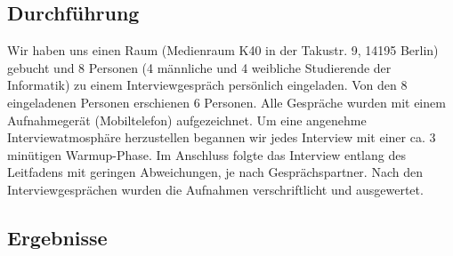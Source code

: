 \documentclass{article}
\begin{document}
\subsection{Durchführung}

Wir haben uns einen Raum (Medienraum K40 in der Takustr. 9, 14195 Berlin) gebucht und 8 Personen (4 männliche und 4 weibliche Studierende der Informatik) zu einem Interviewgespräch persönlich eingeladen. Von den 8 eingeladenen Personen erschienen 6 Personen. Alle Gespräche wurden mit einem Aufnahmegerät (Mobiltelefon) aufgezeichnet. Um eine angenehme Interviewatmosphäre herzustellen begannen wir jedes Interview mit einer ca. 3 minütigen Warmup-Phase. Im Anschluss folgte das Interview entlang des Leitfadens mit geringen Abweichungen, je nach Gesprächspartner. Nach den Interviewgesprächen wurden die Aufnahmen verschriftlicht und ausgewertet.

\subsection{Ergebnisse}
\end{document}
